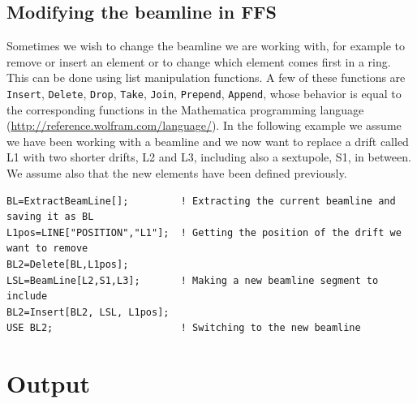 \documentclass{article}
\begin{document}
\subsection{Modifying the beamline in FFS}
Sometimes we wish to change the beamline we are working with, for example to remove or insert an element or to change which element comes first in a ring. This can be done using list manipulation functions. A few of these functions are \texttt{Insert}, \texttt{Delete}, \texttt{Drop}, \texttt{Take}, \texttt{Join}, \texttt{Prepend}, \texttt{Append}, whose behavior is equal to the corresponding functions in the Mathematica programming language (\url{http://reference.wolfram.com/language/}). In the following example we assume we have been working with a beamline and we now want to replace a drift called L1 with two shorter drifts, L2 and L3, including also a sextupole, S1, in between. We assume also that the new elements have been defined previously.
\begin{lstlisting}
BL=ExtractBeamLine[];         ! Extracting the current beamline and saving it as BL
L1pos=LINE["POSITION","L1"];  ! Getting the position of the drift we want to remove
BL2=Delete[BL,L1pos];
LSL=BeamLine[L2,S1,L3];       ! Making a new beamline segment to include 
BL2=Insert[BL2, LSL, L1pos];
USE BL2;                      ! Switching to the new beamline
\end{lstlisting}












\section{Output}
\end{document}

